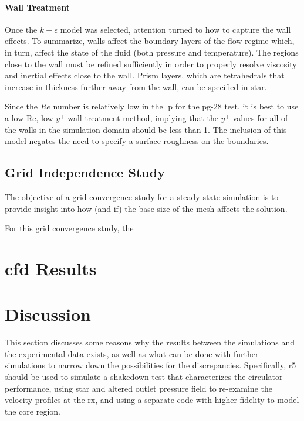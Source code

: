 \documentclass[double,12pt]{beavtex}
\begin{document}
\subsubsection{Wall Treatment}

Once the $k-\epsilon$ model was selected, attention turned to how to capture the wall effects. To summarize, walls affect the boundary layers of the flow regime which, in turn, affect the state of the fluid (both pressure and temperature). The regions close to the wall must be refined sufficiently in order to properly resolve viscosity and inertial effects close to the wall. Prism layers, which are tetrahedrals that increase in thickness further away from the wall, can be specified in \acrshort{star}.

Since the $Re$ number is relatively low in the \acrshort{lp} for the \acrshort{pg}-28 test, it is best to use a low-Re, low $y^{+}$ wall treatment method, implying that the $y^{+}$ values for all of the walls in the simulation domain should be less than 1. The inclusion of this model negates the need to specify a surface roughness on the boundaries. 

\section{Grid Independence Study}

The objective of a grid convergence study for a steady-state simulation is to provide insight into how (and if) the base size of the mesh affects the solution.

For this grid convergence study, the 


\chapter{\acrshort{cfd} Results}



\chapter{Discussion}

This section discusses some reasons why the results between the simulations and the experimental data exists, as well as what can be done with further simulations to narrow down the possibilities for the discrepancies. Specifically, \acrshort{r5} should be used to simulate a shakedown test that characterizes the circulator performance, using \acrshort{star} and altered outlet pressure field to re-examine the velocity profiles at the \acrshort{rx}, and using a separate code with higher fidelity to model the core region. 
\end{document}
